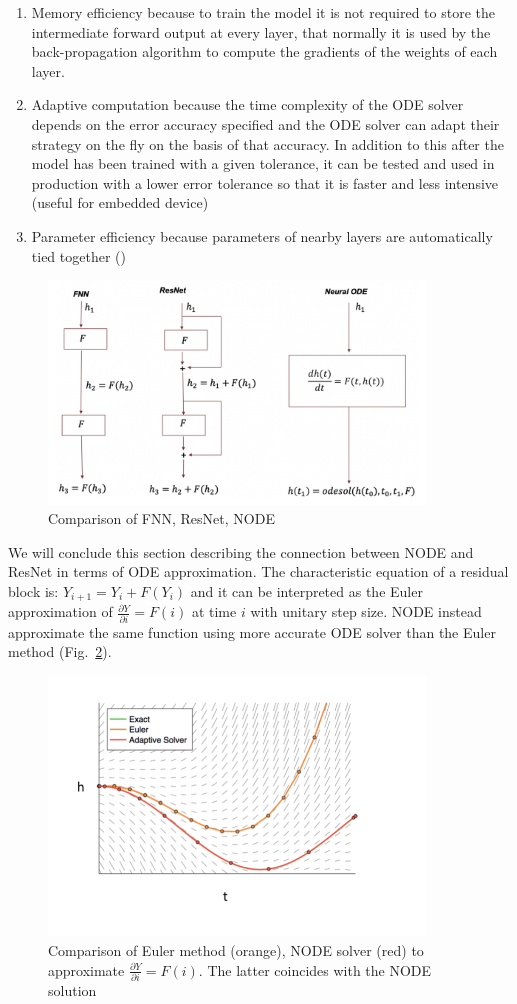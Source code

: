 \documentclass[LaM,binding=0.6cm]{sapthesis}
\begin{document}
\begin{enumerate}
\item Memory efficiency because to train the model it is not required to store the intermediate forward output at every layer, that normally it is used by the back-propagation algorithm to compute the gradients of the weights of each layer.
\item Adaptive computation because the time complexity of the ODE solver depends on the error accuracy specified and the ODE solver can adapt their strategy on the fly on the basis of that accuracy.  In addition to this after the model has been trained with a given tolerance, it can be tested and used in production with a lower error tolerance so that it is faster and less intensive (useful for embedded device)
\item Parameter efficiency because parameters of nearby layers are automatically tied together (\cite{DBLP:journals/corr/abs-1806-07366})
\end{enumerate}
\begin{figure}  \centering
    \includegraphics[width=100mm,scale=0.7]{cmplink.png}
    \caption{Comparison of FNN, ResNet, NODE}
    \label{fig:cmplink}
\end{figure}
We will conclude this section describing the connection between NODE and ResNet in terms of ODE approximation. The characteristic equation of a residual block is: $Y_{i+1} = Y_{i} +F(Y_{i})$ and it can be interpreted as the Euler approximation of $\frac{\partial Y}{\partial i} = F(i)$ at time $i$ with unitary step size. NODE instead approximate the same function using more accurate ODE solver than the Euler method (Fig.~\ref{fig:eulermethod}). 
\begin{figure}  \centering
    \includegraphics[width=100mm,scale=0.7]{eulermethod.png}
    \caption{Comparison of Euler method (orange), NODE solver (red) to approximate  $\frac{\partial Y}{\partial i} = F(i)$. The latter coincides with the NODE solution }
    \label{fig:eulermethod}
\end{figure}
\end{document}
